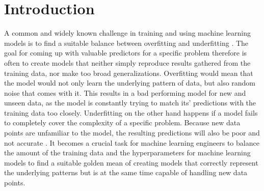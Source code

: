 \chapter{Introduction} \label{chap:introduction}




A common and widely known challenge in training and using machine learning models is to find a suitable balance between overfitting and underfitting \cite{vanderaalst2010}. The goal for coming up with valuable predictors for a specific problem therefore is often to create models that neither simply reproduce results gathered from the training data, nor make too broad generalizations. Overfitting would mean that the model would not only learn the underlying pattern of data, but also random noise that comes with it. This results in a bad performing model for new and unseen data, as the model is constantly trying to match its’ predictions with the training data too closely. Underfitting on the other hand happens if a model fails to completely cover the complexity of a specific problem. Because new data points are unfamiliar to the model, the resulting predictions will also be poor and not accurate \cite{montesinoslopez2022}.  It becomes a crucial task for machine learning engineers to balance the amount of the training data and the hyperparameters for machine learning models to find a suitable golden mean of creating models that correctly represent the underlying patterns but is at the same time capable of handling new data points. 

